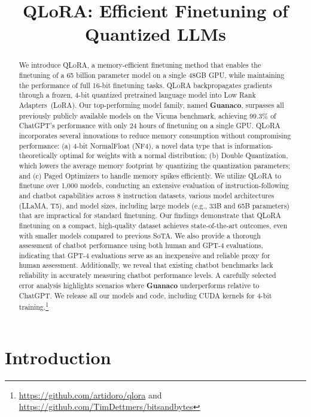 \title{QLoRA: Efficient Finetuning of Quantized LLMs}

\begin{abstract}
We introduce \textsc{QLoRA}, a memory-efficient finetuning method that enables the finetuning of a 65 billion parameter model on a single 48GB GPU, while maintaining the performance of full 16-bit finetuning tasks. \textsc{QLoRA} backpropagates gradients through a frozen, 4-bit quantized pretrained language model into Low Rank Adapters~(LoRA). Our top-performing model family, named \textbf{Guanaco}, surpasses all previously publicly available models on the Vicuna benchmark, achieving 99.3\% of ChatGPT’s performance with only 24 hours of finetuning on a single GPU. \textsc{QLoRA} incorporates several innovations to reduce memory consumption without compromising performance: (a) 4-bit NormalFloat (NF4), a novel data type that is information-theoretically optimal for weights with a normal distribution; (b) Double Quantization, which lowers the average memory footprint by quantizing the quantization parameters; and (c) Paged Optimizers to handle memory spikes efficiently. We utilize \textsc{QLoRA} to finetune over 1,000 models, conducting an extensive evaluation of instruction-following and chatbot capabilities across 8 instruction datasets, various model architectures (LLaMA, T5), and model sizes, including large models (e.g., 33B and 65B parameters) that are impractical for standard finetuning. Our findings demonstrate that QLoRA finetuning on a compact, high-quality dataset achieves state-of-the-art outcomes, even with smaller models compared to previous SoTA. We also provide a thorough assessment of chatbot performance using both human and GPT-4 evaluations, indicating that GPT-4 evaluations serve as an inexpensive and reliable proxy for human assessment. Additionally, we reveal that existing chatbot benchmarks lack reliability in accurately measuring chatbot performance levels. A carefully selected error analysis highlights scenarios where \textbf{Guanaco} underperforms relative to ChatGPT. We release all our models and code, including CUDA kernels for 4-bit training.\footnote{\url{https://github.com/artidoro/qlora} and \url{https://github.com/TimDettmers/bitsandbytes}}
\end{abstract}

\section{Introduction}

